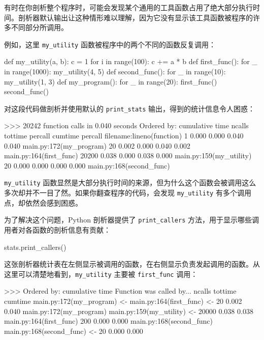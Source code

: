 有时在你剖析整个程序时，可能会发现某个通用的工具函数占用了绝大部分执行时间。剖析器默认输出让这种情形难以理解，因为它没有显示该工具函数被程序的许多不同部分所调用。

例如，这里 \texttt{my\_utility} 函数被程序中的两个不同的函数反复调用：

\begin{codebox}[python]
def my_utility(a, b):
    c = 1
    for i in range(100):
        c += a * b
def first_func():
    for _ in range(1000):
        my_utility(4, 5)
def second_func():
    for _ in range(10):
        my_utility(1, 3)
def my_program():
    for _ in range(20):
        first_func()
        second_func()
\end{codebox}

对这段代码做剖析并使用默认的 \texttt{print\_stats} 输出，得到的统计信息令人困惑：

\begin{codebox}[python]
>>>
          20242 function calls in 0.040 seconds
   Ordered by: cumulative time
   ncalls  tottime  percall  cumtime  percall filename:lineno(function)
         1    0.000    0.000    0.040    0.040 main.py:172(my_program)
        20    0.002    0.000    0.040    0.002 main.py:164(first_func)
     20200    0.038    0.000    0.038    0.000 main.py:159(my_utility)
        20    0.000    0.000    0.000    0.000 main.py:168(second_func)
\end{codebox}

\texttt{my\_utility} 函数显然是大部分执行时间的来源，但为什么这个函数会被调用这么多次却并不一目了然。如果你翻查程序的代码，会发现 \texttt{my\_utility} 有多个调用点，却依然会感到困惑。

为了解决这个问题，Python 剖析器提供了 \texttt{print\_callers} 方法，用于显示哪些调用者对各函数的剖析信息有贡献：

\begin{codebox}[python]
stats.print_callers()
\end{codebox}

这张剖析器统计表在左侧显示被调用的函数，在右侧显示负责发起调用的函数。从这里可以清楚地看到，\texttt{my\_utility} 主要被 \texttt{first\_func} 调用：

\begin{codebox}[python]
>>>
   Ordered by: cumulative time
Function                      was called by...
                                   ncalls  tottime  cumtime
main.py:172(my_program)       <-
main.py:164(first_func)       <-      20    0.002  0.040  main.py:172(my_program)
main.py:159(my_utility)       <-   20000    0.038  0.038  main.py:164(first_func)
                                      200    0.000  0.000  main.py:168(second_func)
main.py:168(second_func)      <-      20    0.000  0.000
\end{codebox}

